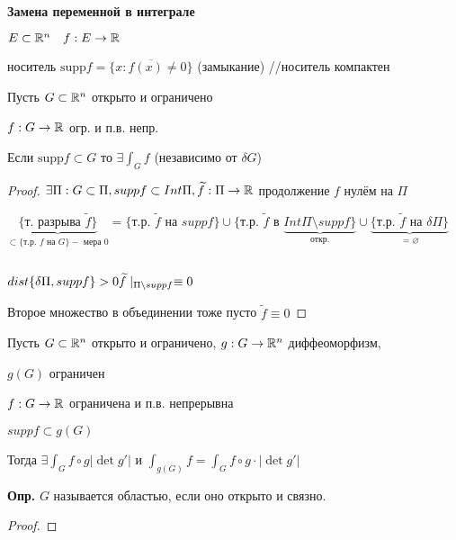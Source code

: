     \textbf{Замена переменной в интеграле}
    
    $E \subset \mathbb{R}^n \quad f: E \to \mathbb{R}$
        
    носитель $\text{supp} f = \overline{\{ x: f(x) \neq 0\}}$ (замыкание)
    \small{//носитель компактен}

    \begin{remark}
        Пусть $G \subset \mathbb{R}^n$ открыто и ограничено

        $f: G \to \mathbb{R}$ огр. и п.в. непр.

        Если $\text{supp} f \subset G$ то $\exists \int_G f$ 
        (независимо от $\delta G$)
    \end{remark}
    \begin{proof}
        $\exists \Pi: G \subset \Pi, supp f \subset Int \Pi, \widetilde{f}: \Pi \to \mathbb{R}$
        продолжение $f$ нулём на $\Pi$

        $\underbrace{\{ \text{т. разрыва } \widetilde{f}\}}_{
            \subset \{ \text{т.р. } f \text{ на } G\} - \text{ мера } 0
            } = \{ \text{т.р. } \widetilde{f} \text{ на } supp f\}
        \cup \{ \text{т.р. } \widetilde{f} \text{ в } \underbrace{Int \Pi\setminus supp f\}}_{\text{откр.}}
        \cup \underbrace{\{ \text{т.р. } \widetilde{f} \text{ на } \delta\Pi\}}_{= \varnothing}
        $
        \par $ $
        
        $dist\{ \delta \Pi, supp f\} > 0 \\
        \widetilde{f} \mid_{\Pi \setminus supp f} \equiv 0
        $

        Второе множество в объединении тоже пусто $\widetilde{f} \equiv 0$
    \end{proof}

    \begin{theorem}
        Пусть $G\subset \mathbb{R}^n $ открыто и ограничено, $g: G\to\mathbb{R}^n$ диффеоморфизм,

        $g(G)$ ограничен

        $f: G \to \mathbb{R}$ ограничена и п.в. непрерывна

        $supp f \subset g(G)$

        Тогда $\exists \int_G f \circ g | \det g' |$ и $\int_{g(G)} f = 
        \int_G f\circ g \cdot |\det g'|$
    \end{theorem}
    \textbf{Опр.}
    $G$ называется областью, если оно открыто и связно.
    
    \begin{proof}
        
    \end{proof}
    
 
